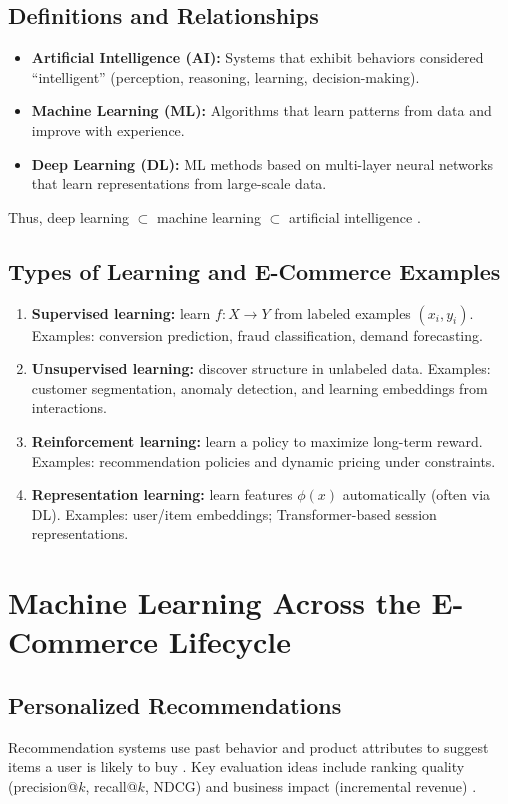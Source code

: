 \subsection{Definitions and Relationships}
\begin{itemize}
  \item \textbf{Artificial Intelligence (AI):} Systems that exhibit behaviors considered ``intelligent'' (perception, reasoning, learning, decision-making).
  \item \textbf{Machine Learning (ML):} Algorithms that learn patterns from data and improve with experience.
  \item \textbf{Deep Learning (DL):} ML methods based on multi-layer neural networks that learn representations from large-scale data.
\end{itemize}
Thus, deep learning $\subset$ machine learning $\subset$ artificial intelligence \citep{goodfellow2016dl,murphy2022ml,hastie2009esl}.

\subsection{Types of Learning and E-Commerce Examples}
\begin{enumerate}
  \item \textbf{Supervised learning:} learn $f:X\rightarrow Y$ from labeled examples $(x_i,y_i)$.
  Examples: conversion prediction, fraud classification, demand forecasting.
  \item \textbf{Unsupervised learning:} discover structure in unlabeled data.
  Examples: customer segmentation, anomaly detection, and learning embeddings from interactions.
  \item \textbf{Reinforcement learning:} learn a policy to maximize long-term reward.
  Examples: recommendation policies and dynamic pricing under constraints.
  \item \textbf{Representation learning:} learn features $\phi(x)$ automatically (often via DL).
  Examples: user/item embeddings; Transformer-based session representations.
\end{enumerate}

\section{Machine Learning Across the E-Commerce Lifecycle}
\subsection{Personalized Recommendations}
Recommendation systems use past behavior and product attributes to suggest items a user is likely to buy \citep{aggarwal2016recsys,koren2009mf}.
Key evaluation ideas include ranking quality (precision@$k$, recall@$k$, NDCG) and business impact (incremental revenue) \citep{jannach2017recsys_eval}.


